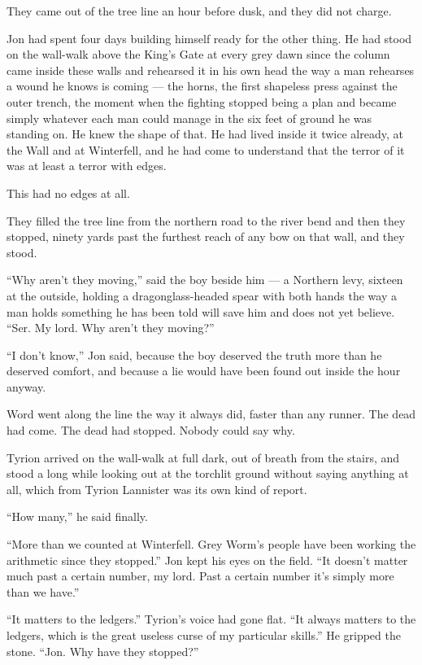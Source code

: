 They came out of the tree line an hour before dusk, and they did not charge.

Jon had spent four days building himself ready for the other thing. He had stood on the wall-walk above the King’s Gate at every grey dawn since the column came inside these walls and rehearsed it in his own head the way a man rehearses a wound he knows is coming — the horns, the first shapeless press against the outer trench, the moment when the fighting stopped being a plan and became simply whatever each man could manage in the six feet of ground he was standing on. He knew the shape of that. He had lived inside it twice already, at the Wall and at Winterfell, and he had come to understand that the terror of it was at least a terror with edges.

This had no edges at all.

They filled the tree line from the northern road to the river bend and then they stopped, ninety yards past the furthest reach of any bow on that wall, and they stood.

“Why aren’t they moving,” said the boy beside him — a Northern levy, sixteen at the outside, holding a dragonglass-headed spear with both hands the way a man holds something he has been told will save him and does not yet believe. “Ser. My lord. Why aren’t they moving?”

“I don’t know,” Jon said, because the boy deserved the truth more than he deserved comfort, and because a lie would have been found out inside the hour anyway.

\sceneBreak

Word went along the line the way it always did, faster than any runner. The dead had come. The dead had stopped. Nobody could say why.

Tyrion arrived on the wall-walk at full dark, out of breath from the stairs, and stood a long while looking out at the torchlit ground without saying anything at all, which from Tyrion Lannister was its own kind of report.

“How many,” he said finally.

“More than we counted at Winterfell. Grey Worm’s people have been working the arithmetic since they stopped.” Jon kept his eyes on the field. “It doesn’t matter much past a certain number, my lord. Past a certain number it’s simply more than we have.”

“It matters to the ledgers.” Tyrion’s voice had gone flat. “It always matters to the ledgers, which is the great useless curse of my particular skills.” He gripped the stone. “Jon. Why have they stopped?”

